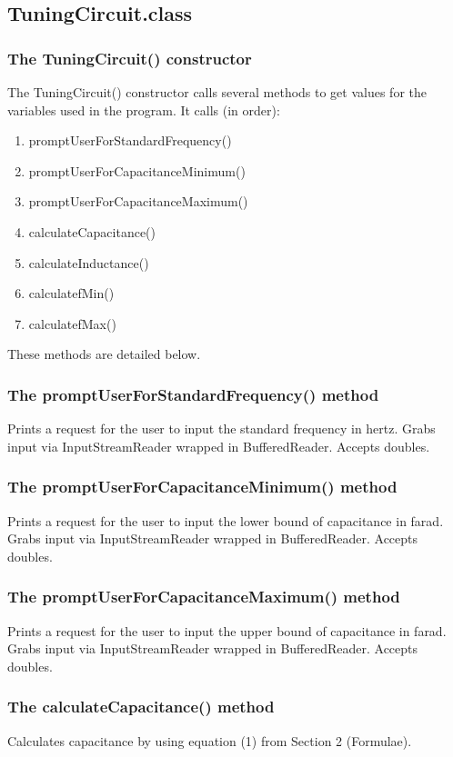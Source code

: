 \documentclass[12pt]{article}
\begin{document}
\subsection{TuningCircuit.class}
\subsubsection{The TuningCircuit() constructor}
The TuningCircuit() constructor calls several methods to get values for the variables used in the program. It calls (in order):
\begin{enumerate}
\item promptUserForStandardFrequency()
\item promptUserForCapacitanceMinimum()
\item promptUserForCapacitanceMaximum()
\item calculateCapacitance()
\item calculateInductance()
\item calculatefMin()
\item calculatefMax()
\end{enumerate}
These methods are detailed below.

\subsubsection{The promptUserForStandardFrequency() method}
Prints a request for the user to input the standard frequency in hertz. Grabs input via InputStreamReader wrapped in BufferedReader. Accepts doubles.
\subsubsection{The promptUserForCapacitanceMinimum() method}
Prints a request for the user to input the lower bound of capacitance in farad. Grabs input via InputStreamReader wrapped in BufferedReader. Accepts doubles.
\subsubsection{The promptUserForCapacitanceMaximum() method}
Prints a request for the user to input the upper bound of capacitance in farad. Grabs input via InputStreamReader wrapped in BufferedReader. Accepts doubles.
\subsubsection{The calculateCapacitance() method}
Calculates capacitance by using equation (1) from Section 2 (Formulae).
\end{document}
